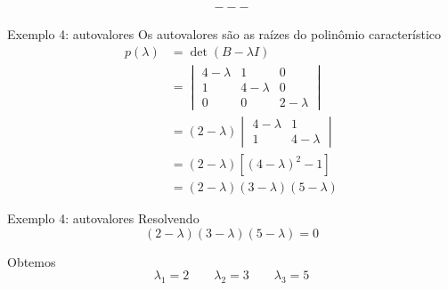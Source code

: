 
\begin{align*}
---
\end{align*}


\begin{frame}{Exemplo 4: autovalores}
    Os autovalores são as raízes do polinômio característico
    \begin{align*}
        p(\lambda)
        &=\det(B-\lambda I)\\
        &=
        \begin{vmatrix}
            4-\lambda & 1 & 0\\
            1 & 4-\lambda & 0\\
            0 & 0 & 2-\lambda
        \end{vmatrix}\\
        &=(2-\lambda)
        \begin{vmatrix}
            4-\lambda & 1\\
            1 & 4-\lambda
        \end{vmatrix}\\
        &=(2-\lambda)
        \left[(4-\lambda)^2-1\right]\\
        &=(2-\lambda)(3-\lambda)(5-\lambda)
    \end{align*}
\end{frame}

\begin{frame}{Exemplo 4: autovalores}
    Resolvendo
    \[
        (2-\lambda)(3-\lambda)(5-\lambda)=0
    \]

    Obtemos
    \[
        \lambda_{1}=2
        \qquad
        \lambda_{2}=3
        \qquad
        \lambda_{3}=5
    \]
\end{frame}

